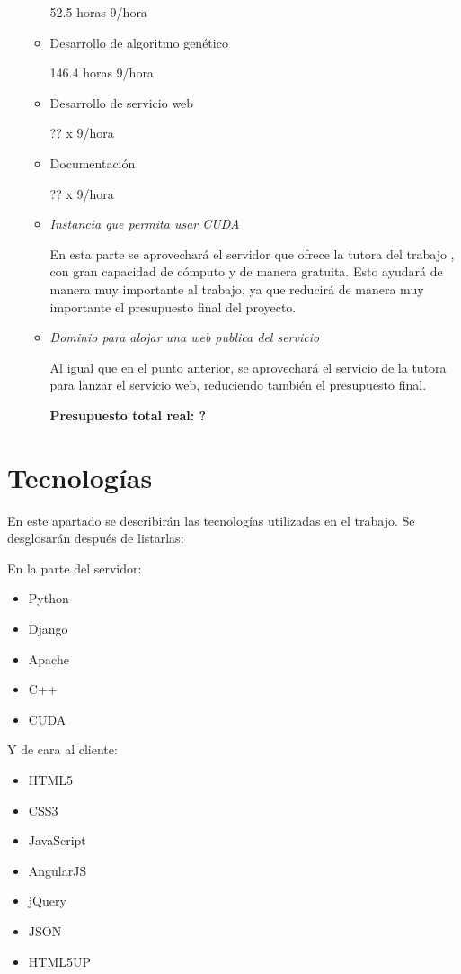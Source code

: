 \begin{itemize}
\begin{itemize}
		52.5 horas 9\officialeuro/hora
		
		\item Desarrollo de algoritmo genético
		
		146.4 horas 9\officialeuro/hora
		
		\item Desarrollo de servicio web
		
		?? x 9\officialeuro/hora
		
		\item Documentación

		?? x 9\officialeuro/hora
		
		\item \textit{Instancia que permita usar CUDA}
		
		En esta parte se aprovechará el servidor que ofrece la tutora del trabajo {\tutor}, con gran capacidad de cómputo y de manera gratuita. Esto ayudará de manera muy importante al trabajo, ya que reducirá de manera muy importante el presupuesto final del proyecto.
		
		\item \textit{Dominio para alojar una web publica del servicio}
		
		Al igual que en el punto anterior, se aprovechará el servicio de la tutora para lanzar el servicio web, reduciendo también el presupuesto final.
		
		\bigskip
		\textbf{Presupuesto total real: ? \officialeuro}
		
	\end{itemize}

\end{itemize}



\newpage
\section{Tecnologías}

En este apartado se describirán las tecnologías utilizadas en el trabajo. Se desglosarán después de listarlas:

\bigskip
En la parte del servidor:
\begin{itemize}
	\item Python
	\item Django
	\item Apache
	\item C++
	\item CUDA
\end{itemize}

Y de cara al cliente:
\begin{itemize}
	\item HTML5
	\item CSS3
	\item JavaScript
	\item AngularJS
	\item jQuery
	\item JSON
	\item HTML5UP
\end{itemize}

